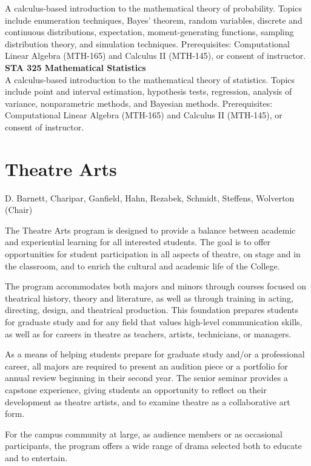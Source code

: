 \documentclass[
  letterpaper,
]{scrbook}
\begin{document}
A calculus-based introduction to the mathematical theory of probability.
Topics include enumeration techniques, Bayes' theorem, random variables,
discrete and continuous distributions, expectation, moment-generating
functions, sampling distribution theory, and simulation techniques.
Prerequisites: Computational Linear Algebra (MTH-165) and Calculus II
(MTH-145), or consent of instructor.\\
\textbf{STA 325 Mathematical Statistics}\\
A calculus-based introduction to the mathematical theory of statistics.
Topics include point and interval estimation, hypothesis tests,
regression, analysis of variance, nonparametric methods, and Bayesian
methods. Prerequisites: Computational Linear Algebra (MTH-165) and
Calculus II (MTH-145), or consent of instructor.

\section{Theatre Arts}\label{theatre-arts}

D. Barnett, Charipar, Ganfield, Hahn, Rezabek, Schmidt, Steffens,
Wolverton (Chair)

The Theatre Arts program is designed to provide a balance between
academic and experiential learning for all interested students. The goal
is to offer opportunities for student participation in all aspects of
theatre, on stage and in the classroom, and to enrich the cultural and
academic life of the College.

The program accommodates both majors and minors through courses focused
on theatrical history, theory and literature, as well as through
training in acting, directing, design, and theatrical production. This
foundation prepares students for graduate study and for any field that
values high-level communication skills, as well as for careers in
theatre as teachers, artists, technicians, or managers.

As a means of helping students prepare for graduate study and/or a
professional career, all majors are required to present an audition
piece or a portfolio for annual review beginning in their second year.
The senior seminar provides a capstone experience, giving students an
opportunity to reflect on their development as theatre artists, and to
examine theatre as a collaborative art form.

For the campus community at large, as audience members or as occasional
participants, the program offers a wide range of drama selected both to
educate and to entertain.
\end{document}
